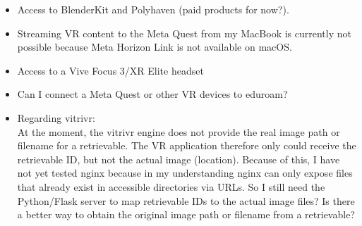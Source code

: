 \documentclass{article}
\begin{document}
\support
\begin{itemize}
    \item Access to BlenderKit and Polyhaven (paid products for now?).
    \item Streaming VR content to the Meta Quest from my MacBook is currently not possible because Meta Horizon Link is not available on macOS.
    \item Access to a Vive Focus 3/XR Elite headset
    \item Can I connect a Meta Quest or other VR devices to eduroam?
    \item Regarding vitrivr:\\
    At the moment, the vitrivr engine does not provide the real image path or filename for a retrievable. The VR application therefore only could receive the retrievable ID, but not the actual image (location). Because of this, I have not yet tested nginx because in my understanding nginx can only expose files that already exist in accessible directories via URLs. So I still need the Python/Flask server to map retrievable IDs to the actual image files? Is there a better way to obtain the original image path or filename from a retrievable?
\end{itemize}

\newpage
\plan
{}
\end{document}
